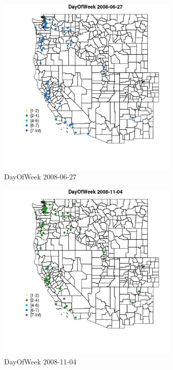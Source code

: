 \begin{figure} 
\centering  
\includegraphics[width=0.77\textwidth]{Code_Outputs/Report_ML_input_PM25_Step4_part_e_de_duplicated_aves_MapObsDayOfWeek2008-06-27.jpg} 
\caption{\label{fig:Report_ML_input_PM25_Step4_part_e_de_duplicated_avesMapObsDayOfWeek2008-06-27}DayOfWeek 2008-06-27} 
\end{figure} 
 

\clearpage 

\begin{figure} 
\centering  
\includegraphics[width=0.77\textwidth]{Code_Outputs/Report_ML_input_PM25_Step4_part_e_de_duplicated_aves_MapObsDayOfWeek2008-11-04.jpg} 
\caption{\label{fig:Report_ML_input_PM25_Step4_part_e_de_duplicated_avesMapObsDayOfWeek2008-11-04}DayOfWeek 2008-11-04} 
\end{figure} 
 

